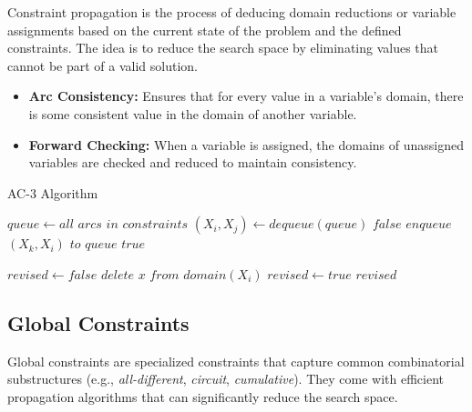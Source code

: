 Constraint propagation is the process of deducing domain reductions or variable assignments based on the current state of the problem and the defined constraints. The idea is to reduce the search space by eliminating values that cannot be part of a valid solution.

\begin{itemize}
    \item \textbf{Arc Consistency:} Ensures that for every value in a variable's domain, there is some consistent value in the domain of another variable.
    \item \textbf{Forward Checking:} When a variable is assigned, the domains of unassigned variables are checked and reduced to maintain consistency.
\end{itemize}


\begin{algorithm}
\caption{AC-3 Algorithm}
\begin{algorithmic}[1]
    \State $queue \gets all$ $arcs$ $in$ $constraints$
        \State $(X_i, X_j) \gets dequeue(queue)$
                \State \Return $false$
            \EndIf
                \State $enqueue$ $(X_k, X_i)$ $to$ $queue$
            \EndFor
        \EndIf
    \EndWhile
    \State \Return $true$
\EndProcedure

    \State $revised \gets false$
            \State $delete$ $x$ $from$ $domain(X_i)$
            \State $revised \gets true$
        \EndIf
    \EndFor
    \State \Return $revised$
\EndFunction
\end{algorithmic}
\end{algorithm}


\subsection{Global Constraints}

Global constraints are specialized constraints that capture common combinatorial substructures (e.g., \textit{all-different}, \textit{circuit}, \textit{cumulative}). They come with efficient propagation algorithms that can significantly reduce the search space.

